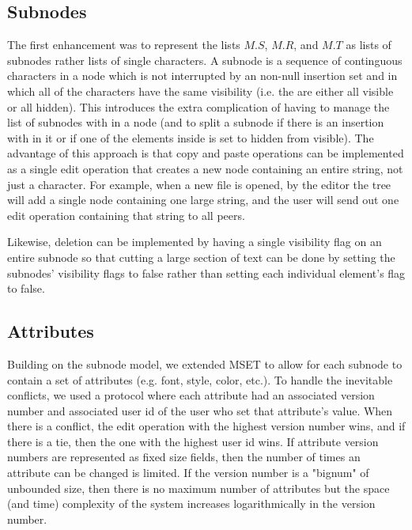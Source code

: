 \documentclass{amsart}
\begin{document}
\subsection{Subnodes}
The first enhancement was to represent the lists $M.S$, $M.R$, and $M.T$ as lists of subnodes rather lists of single characters.  A subnode is a sequence of continguous characters in a node which is not interrupted by an non-null insertion set and in which all of the characters have the same visibility (i.e. the are either all visible or all hidden).  This introduces the extra complication of having to manage the list of subnodes with in a node (and to split a subnode if there is an insertion with in it or if one of the elements inside is set to hidden from visible).  The advantage of this approach is that copy and paste operations can be implemented as a single edit operation that creates a new node containing an entire string, not just a character.
For example, when a new file is opened, by the editor the tree will add a single node
containing one large string, and the user will send out one edit operation containing that string to all peers.

Likewise, deletion can be implemented by having a single visibility flag on an entire subnode so that cutting a large section of text can be done by setting the subnodes' visibility flags to false rather than setting each individual element's flag to false.

\subsection{Attributes}
Building on the subnode model, we extended MSET to allow for each subnode to contain a set of attributes (e.g. font, style, color, etc.). To handle the inevitable conflicts, we used a protocol where each attribute had an associated version number and associated user id of the user who set that attribute's value.  When there is a conflict, the edit operation with the highest version number wins, and if there is a tie, then the one with the highest user id wins. If attribute version numbers are
represented as fixed size fields, then the number of times an attribute can be changed is limited.  If the version number is a "bignum" of unbounded size, then there is no maximum number of attributes but the space (and time) complexity of the system increases logarithmically in the version number.
\end{document}
